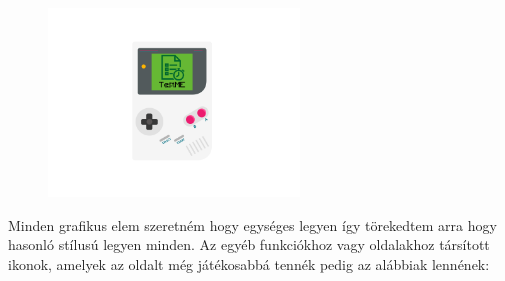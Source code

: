 \begin{figure}[h]
    \centering
    \includegraphics[height=5cm]{images/gameboy.png}
\end{figure}


Minden grafikus elem szeretném hogy egységes legyen így törekedtem arra hogy hasonló stílusú legyen minden. Az egyéb funkciókhoz vagy oldalakhoz társított ikonok, amelyek az oldalt még játékosabbá tennék pedig az alábbiak lennének:

